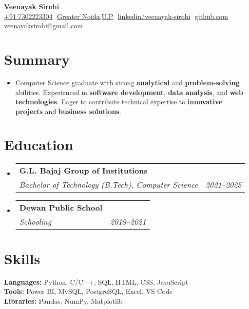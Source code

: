 \documentclass[letterpaper,11pt]{article}
\makeatletter
\newcommand{\resumeItem}[1]{
  \item\small{
    {#1 \vspace{-2pt}}
  }
}
\newcommand{\resumeSubheading}[4]{
  \vspace{-2pt}\item
    \begin{tabular*}{0.97\textwidth}[t]{l@{\extracolsep{\fill}}r}
      \textbf{#1} & #2 \\
      \textit{\small#3} & \textit{\small #4} \\
    \end{tabular*}\vspace{-7pt}
}
\newcommand{\resumeSubHeadingListStart}{\begin{itemize}[leftmargin=0.15in, label={}]}
\newcommand{\resumeSubHeadingListEnd}{\end{itemize}}
\makeatother
\begin{document}
\begin{center}
    \textbf{\Huge Veenayak Sirohi} \\ \vspace{8pt}
    \small {}\href{tel:+917302223304}{\underline{+91 7302223304}} $  $
    \faMapMarker*\href{https://maps.app.goo.gl/f7FABi82qTye3gzH8}{\underline{Greater Noida,U.P}} $  $
    \href{https://www.linkedin.com/in/veenayak-sirohi-ab30ab227}{\underline{linkedin/veenayak-sirohi}} $  $
    \href{https://github.com/veenayaksirohi}{\underline{github.com}} $  $
    \href{mailto:veenayaksirohi@gmail.com}{\underline{veenayaksirohi@gmail.com}}
\end{center}

\section{Summary}
  \resumeSubHeadingListStart
    \resumeItem{Computer Science graduate with strong \textbf{analytical} and \textbf{problem-solving} abilities. Experienced in \textbf{software development}, \textbf{data analysis}, and \textbf{web technologies}. Eager to contribute technical expertise to \textbf{innovative projects} and \textbf{business solutions}.}
  \resumeSubHeadingListEnd

\section{Education}
  \resumeSubHeadingListStart
    \resumeSubheading
      {G.L. Bajaj Group of Institutions}{}
      {Bachelor of Technology (B.Tech), Computer Science}{2021--2025}
    \resumeSubheading
      {Dewan Public School}{}
      {Schooling}{2019--2021}
  \resumeSubHeadingListEnd

\section{Skills}
 \begin{itemize}[leftmargin=0.15in, label={}]
    \small{\item{
     \textbf{Languages:} Python, C/C++, SQL, HTML, CSS, JavaScript \\
     \textbf{Tools:} Power BI, MySQL, PostgreSQL, Excel, VS Code \\
     \textbf{Libraries:} Pandas, NumPy, Matplotlib
    }}
 \end{itemize}
\end{document}
